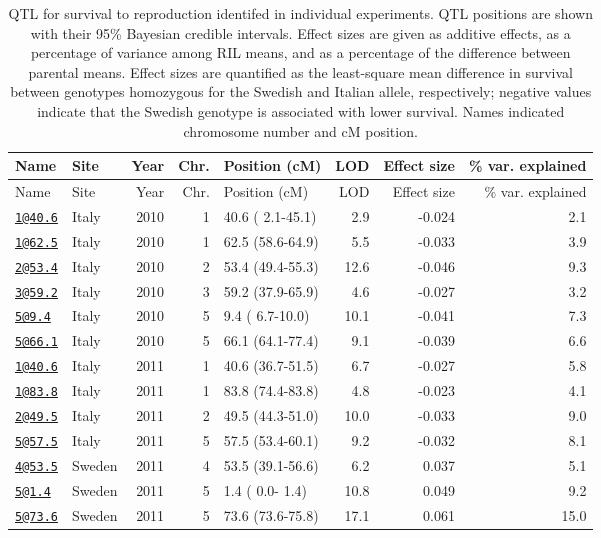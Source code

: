\documentclass[]{article}
\begin{document}
\begin{longtable}[]{@{}llrrlrrr@{}}
\caption{\label{tab:individual-surv-qtl}QTL for survival to reproduction identifed in individual experiments. QTL positions are shown with their 95\% Bayesian credible intervals. Effect sizes are given as additive effects, as a percentage of variance among RIL means, and as a percentage of the difference between parental means. Effect sizes are quantified as the least-square mean difference in survival between genotypes homozygous for the Swedish and Italian allele, respectively; negative values indicate that the Swedish genotype is associated with lower survival. Names indicated chromosome number and cM position.}\tabularnewline
\toprule
Name & Site & Year & Chr. & Position (cM) & LOD & Effect size & \% var. explained\tabularnewline
\midrule
\endfirsthead
\toprule
Name & Site & Year & Chr. & Position (cM) & LOD & Effect size & \% var. explained\tabularnewline
\midrule
\endhead
\href{mailto:1@40.6}{\nolinkurl{1@40.6}} & Italy & 2010 & 1 & 40.6 ( 2.1-45.1) & 2.9 & -0.024 & 2.1\tabularnewline
\href{mailto:1@62.5}{\nolinkurl{1@62.5}} & Italy & 2010 & 1 & 62.5 (58.6-64.9) & 5.5 & -0.033 & 3.9\tabularnewline
\href{mailto:2@53.4}{\nolinkurl{2@53.4}} & Italy & 2010 & 2 & 53.4 (49.4-55.3) & 12.6 & -0.046 & 9.3\tabularnewline
\href{mailto:3@59.2}{\nolinkurl{3@59.2}} & Italy & 2010 & 3 & 59.2 (37.9-65.9) & 4.6 & -0.027 & 3.2\tabularnewline
\href{mailto:5@9.4}{\nolinkurl{5@9.4}} & Italy & 2010 & 5 & 9.4 ( 6.7-10.0) & 10.1 & -0.041 & 7.3\tabularnewline
\href{mailto:5@66.1}{\nolinkurl{5@66.1}} & Italy & 2010 & 5 & 66.1 (64.1-77.4) & 9.1 & -0.039 & 6.6\tabularnewline
\href{mailto:1@40.6}{\nolinkurl{1@40.6}} & Italy & 2011 & 1 & 40.6 (36.7-51.5) & 6.7 & -0.027 & 5.8\tabularnewline
\href{mailto:1@83.8}{\nolinkurl{1@83.8}} & Italy & 2011 & 1 & 83.8 (74.4-83.8) & 4.8 & -0.023 & 4.1\tabularnewline
\href{mailto:2@49.5}{\nolinkurl{2@49.5}} & Italy & 2011 & 2 & 49.5 (44.3-51.0) & 10.0 & -0.033 & 9.0\tabularnewline
\href{mailto:5@57.5}{\nolinkurl{5@57.5}} & Italy & 2011 & 5 & 57.5 (53.4-60.1) & 9.2 & -0.032 & 8.1\tabularnewline
\href{mailto:4@53.5}{\nolinkurl{4@53.5}} & Sweden & 2011 & 4 & 53.5 (39.1-56.6) & 6.2 & 0.037 & 5.1\tabularnewline
\href{mailto:5@1.4}{\nolinkurl{5@1.4}} & Sweden & 2011 & 5 & 1.4 ( 0.0- 1.4) & 10.8 & 0.049 & 9.2\tabularnewline
\href{mailto:5@73.6}{\nolinkurl{5@73.6}} & Sweden & 2011 & 5 & 73.6 (73.6-75.8) & 17.1 & 0.061 & 15.0\tabularnewline
\bottomrule
\end{longtable}

\newpage
\end{document}

